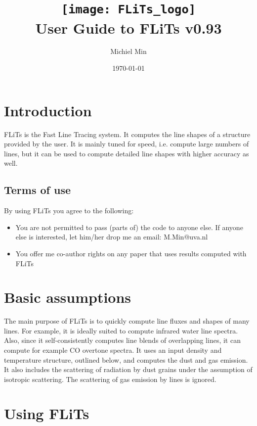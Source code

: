 \documentclass[12pt]{article}
\begin{document}
\title{\texttt{[image: FLiTs\_logo]}\\User Guide to FLiTs v0.93}
\author{Michiel Min}
\date{\today}
\maketitle

\section{Introduction}

FLiTs is the Fast Line Tracing system. It computes the line shapes of a structure provided by the user. It is mainly tuned for speed, i.e. compute large numbers of lines, but it can be used to compute detailed line shapes with higher accuracy as well.

\subsection{Terms of use}

By using FLiTs you agree to the following:
\begin{itemize}
\item You are not permitted to pass (parts of) the code to anyone else. If anyone else is interested, let him/her drop me an email: M.Min@uva.nl
\item You offer me co-author rights on any paper that uses results computed with FLiTs
\end{itemize}

\section{Basic assumptions}

The main purpose of FLiTs is to quickly compute line fluxes and shapes of many lines. For example, it is ideally suited to compute infrared water line spectra. Also, since it self-consistently computes line blends of overlapping lines, it can compute for example CO overtone spectra. It uses an input density and temperature structure, outlined below, and computes the dust and gas emission. It also includes the scattering of radiation by dust grains under the assumption of isotropic scattering. The scattering of gas emission by lines is ignored.

\section{Using FLiTs}
\end{document}
